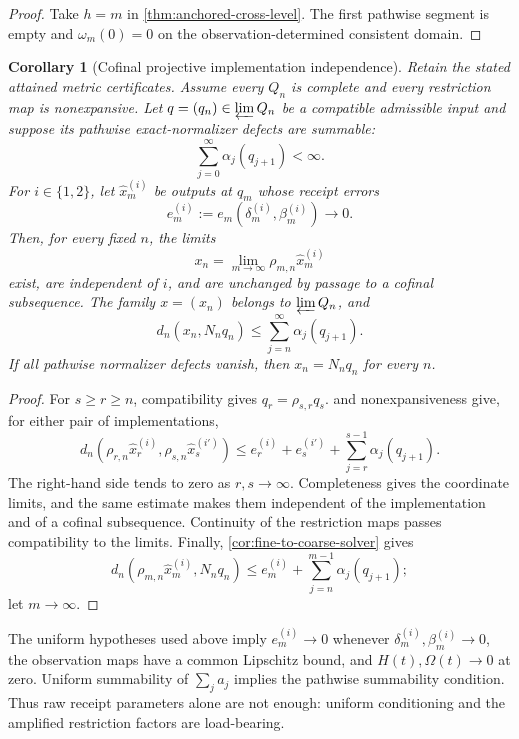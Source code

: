 \documentclass[11pt]{article}
\newtheorem{corollary}[theorem]{Corollary}
\theoremstyle{definition}
\theoremstyle{remark}
\numberwithin{equation}{section}
\begin{document}
\begin{proof}
Take $h=m$ in \cref{thm:anchored-cross-level}.  The first pathwise segment
is empty and $\omega_m(0)=0$ on the observation-determined consistent
domain.
\end{proof}

\begin{corollary}[Cofinal projective implementation independence]
\label{cor:cofinal-projective}
Retain the stated attained metric certificates. Assume every $Q_n$ is complete and every restriction map is nonexpansive.
Let $q=(q_n)\in\varprojlim Q_n$ be a compatible admissible input and suppose
its pathwise exact-normalizer defects are summable:
\[
 \sum_{j=0}^{\infty}\alpha_j(q_{j+1})<\infty.
\]
For $i\in\{1,2\}$, let $\widehat x_m^{(i)}$ be outputs at $q_m$ whose
receipt errors
\[
 e_m^{(i)}
 :=
 e_m(\delta_m^{(i)},\beta_m^{(i)})
 \longrightarrow0.
\]
Then, for every fixed $n$, the limits
\[
 x_n
 =
 \lim_{m\to\infty}\rho_{m,n}\widehat x_m^{(i)}
\]
exist, are independent of $i$, and are unchanged by passage to a cofinal
subsequence.  The family $x=(x_n)$ belongs to $\varprojlim Q_n$, and
\[
 d_n(x_n,N_nq_n)
 \le
 \sum_{j=n}^{\infty}\alpha_j(q_{j+1}).
\]
If all pathwise normalizer defects vanish, then $x_n=N_nq_n$ for every $n$.
\end{corollary}

\begin{proof}
For $s\ge r\ge n$, compatibility gives $q_r=\rho_{s,r}q_s$.
 and nonexpansiveness give, for either pair of
implementations,
\[
 d_n\!\left(
 \rho_{r,n}\widehat x_r^{(i)},
 \rho_{s,n}\widehat x_s^{(i')}
 \right)
 \le
 e_r^{(i)}+e_s^{(i')}
 +\sum_{j=r}^{s-1}\alpha_j(q_{j+1}).
\]
The right-hand side tends to zero as $r,s\to\infty$.  Completeness gives
the coordinate limits, and the same estimate makes them independent of the
implementation and of a cofinal subsequence.  Continuity of the restriction
maps passes compatibility to the limits.  Finally,
\cref{cor:fine-to-coarse-solver} gives
\[
 d_n\!\left(
 \rho_{m,n}\widehat x_m^{(i)},N_nq_n
 \right)
 \le
 e_m^{(i)}
 +\sum_{j=n}^{m-1}\alpha_j(q_{j+1});
\]
let $m\to\infty$.
\end{proof}

The uniform hypotheses used above imply $e_m^{(i)}\to0$ whenever
$\delta_m^{(i)},\beta_m^{(i)}\to0$, the observation maps have a common
Lipschitz bound, and $H(t),\Omega(t)\to0$ at zero.  Uniform summability of
$\sum_j a_j$ implies the pathwise summability condition.  Thus raw receipt
parameters alone are not enough: uniform conditioning and the amplified
restriction factors are load-bearing.
\end{document}
